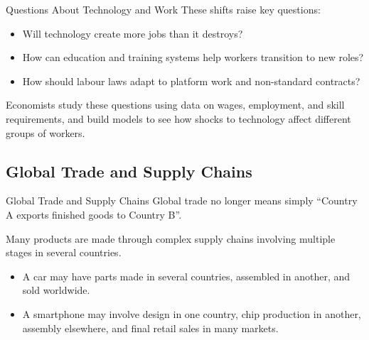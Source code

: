 \documentclass[aspectratio=169]{beamer}
\begin{document}
\begin{frame}{Questions About Technology and Work}
  \transfade
  These shifts raise key questions:

  \begin{itemize}
    \item Will technology create more jobs than it destroys?
    \item How can education and training systems help workers transition to new roles?
    \item How should labour laws adapt to platform work and non-standard contracts?
  \end{itemize}

  \vspace{0.3cm}
  Economists study these questions using data on wages, employment, and skill requirements,
  and build models to see how shocks to technology affect different groups of workers.
\end{frame}

\subsection{Global Trade and Supply Chains}

\begin{frame}{Global Trade and Supply Chains}
  \transfade
  Global trade no longer means simply ``Country A exports finished goods to Country B''.

  \vspace{0.2cm}
  Many products are made through complex supply chains involving multiple stages in several
  countries.

  \begin{itemize}
    \item A car may have parts made in several countries, assembled in another, and sold worldwide.
    \item A smartphone may involve design in one country, chip production in another, assembly
    elsewhere, and final retail sales in many markets.
  \end{itemize}
\end{frame}
\end{document}
